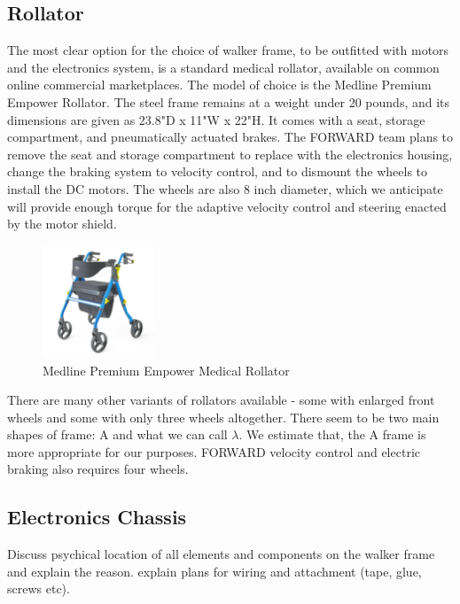 \subsection{Rollator}
\noindent The most clear option for the choice of walker frame, to be outfitted with motors and the electronics system, is a standard medical rollator, available on common online commercial marketplaces. The model of choice is the Medline Premium Empower Rollator. The steel frame remains at a weight under 20 pounds, and its dimensions are given as 23.8"D x 11"W x 22"H. It comes with a seat, storage compartment, and pneumatically actuated brakes. The FORWARD team plans to remove the seat and storage compartment to replace with the electronics housing, change the braking system to velocity control, and to dismount the wheels to install the DC motors. The wheels are also 8 inch diameter, which we anticipate will provide enough torque for the adaptive velocity control and steering enacted by the motor shield.\\

\begin{figure}[H]
	\centering
	\includegraphics[width=0.3\textwidth]{./Images/rollator-amaz.jpg}
	\caption{\label{fig:rollator-amaz}Medline Premium Empower Medical Rollator}
\end{figure}

\noindent There are many other variants of rollators available - some with enlarged front wheels and some with only three wheels altogether. There seem to be two main shapes of frame: A and what we can call $\lambda$. We estimate that, the A frame is more appropriate for our purposes. FORWARD velocity control and electric braking also requires four wheels.\\

\subsection{Electronics Chassis}
\noindent Discuss psychical location of all elements and components on the walker frame and explain the reason. explain plans for wiring and attachment (tape, glue, screws etc).\\

